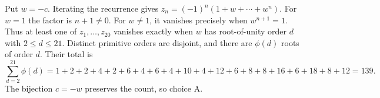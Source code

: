 Put $w=-c$. Iterating the recurrence gives $z_n=(-1)^n(1+w+\cdots+w^n)$. For $w=1$ the factor is $n+1\ne0$. For $w\ne1$, it vanishes precisely when $w^{n+1}=1$. Thus at least one of $z_1,\ldots,z_{20}$ vanishes exactly when $w$ has root-of-unity order $d$ with $2\le d\le21$. Distinct primitive orders are disjoint, and there are $\phi(d)$ roots of order $d$. Their total is
\[\sum_{d=2}^{21}\phi(d)=1+2+2+4+2+6+4+6+4+10+4+12+6+8+8+16+6+18+8+12=\boxed{139}.\]
The bijection $c=-w$ preserves the count, so choice A.
